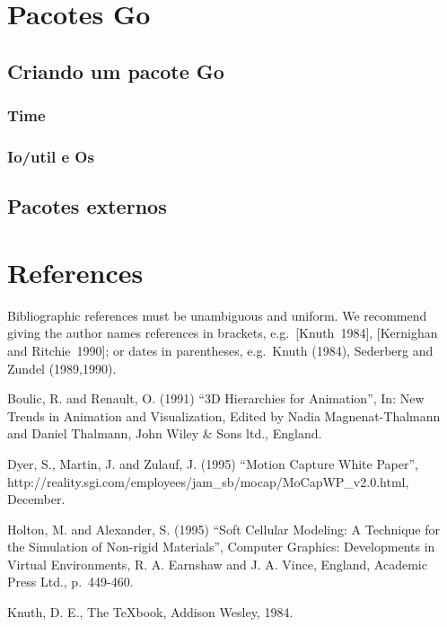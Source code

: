 \documentclass{SBCbookchapter}
\begin{document}
\section{Pacotes Go}
\subsection{Criando um pacote Go}
\subsubsection{Time}
\subsubsection{Io/util e Os}
\subsection{Pacotes externos}


\section{References}
Bibliographic references must be unambiguous and uniform.  We
recommend giving the author names references in brackets,
e.g.~[Knuth~1984], [Kernighan and Ritchie~1990]; or dates in
parentheses, e.g.~Knuth (1984), Sederberg and Zundel (1989,1990).

\begin{thebibliography}{99}
 Boulic, R. and Renault, O. (1991) ``3D Hierarchies for
  Animation'', In: New Trends in Animation and Visualization, Edited
  by Nadia Magnenat-Thalmann and Daniel Thalmann, John Wiley \& Sons
  ltd., England.

 Dyer, S., Martin, J. and Zulauf, J. (1995) ``Motion
  Capture White Paper'',
  http://reality.sgi.com/employees/jam\_sb/mocap/MoCapWP\_v2.0.html,
  December.

 Holton, M. and Alexander, S. (1995) ``Soft Cellular
  Modeling: A Technique for the Simulation of Non-rigid Materials'',
  Computer Graphics: Developments in Virtual Environments, R. A.
  Earnshaw and J. A. Vince, England, Academic Press Ltd., p.~449-460.

 Knuth, D. E., The TeXbook, Addison Wesley, 1984.
\end{thebibliography}
\end{document}
